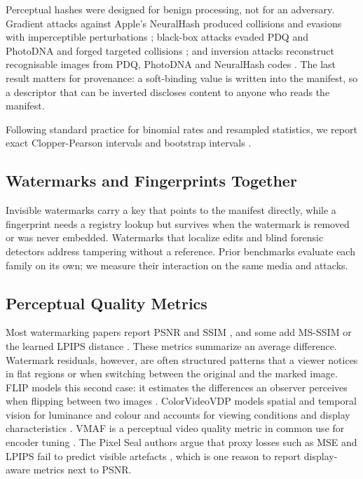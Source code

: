 Perceptual hashes were designed for benign processing, not for an adversary. Gradient attacks against Apple's NeuralHash produced collisions and evasions with imperceptible perturbations \cite{struppek2022neuralhash}; black-box attacks evaded PDQ and PhotoDNA and forged targeted collisions \cite{jain2022adversarial, prokos2023squint, dolhansky2020collision}; and inversion attacks reconstruct recognisable images from PDQ, PhotoDNA and NeuralHash codes \cite{hawkes2025inversion, madden2024robustness}. The last result matters for provenance: a soft-binding value is written into the manifest, so a descriptor that can be inverted discloses content to anyone who reads the manifest.

Following standard practice for binomial rates and resampled statistics, we report exact Clopper-Pearson intervals \cite{clopper1934} and bootstrap intervals \cite{efron1979bootstrap}.

\subsection{Watermarks and Fingerprints Together}
Invisible watermarks \cite{bui2025trustmark, sanroman2024audioseal, fernandez2024videoseal} carry a key that points to the manifest directly, while a fingerprint needs a registry lookup but survives when the watermark is removed or was never embedded. Watermarks that localize edits \cite{zhang2024editguard, zhang2025omniguard} and blind forensic detectors \cite{guillaro2023trufor} address tampering without a reference. Prior benchmarks evaluate each family on its own; we measure their interaction on the same media and attacks.

\subsection{Perceptual Quality Metrics}
Most watermarking papers report PSNR and SSIM \cite{wang2004ssim}, and some add MS-SSIM \cite{wang2003msssim} or the learned LPIPS distance \cite{zhang2018lpips}. These metrics summarize an average difference. Watermark residuals, however, are often structured patterns that a viewer notices in flat regions or when switching between the original and the marked image. FLIP models this second case: it estimates the differences an observer perceives when flipping between two images \cite{andersson2020flip}. ColorVideoVDP models spatial and temporal vision for luminance and colour and accounts for viewing conditions and display characteristics \cite{mantiuk2024cvvdp}. VMAF is a perceptual video quality metric in common use for encoder tuning \cite{rassool2017vmaf}. The Pixel Seal authors argue that proxy losses such as MSE and LPIPS fail to predict visible artefacts \cite{soucek2025pixelseal}, which is one reason to report display-aware metrics next to PSNR.

